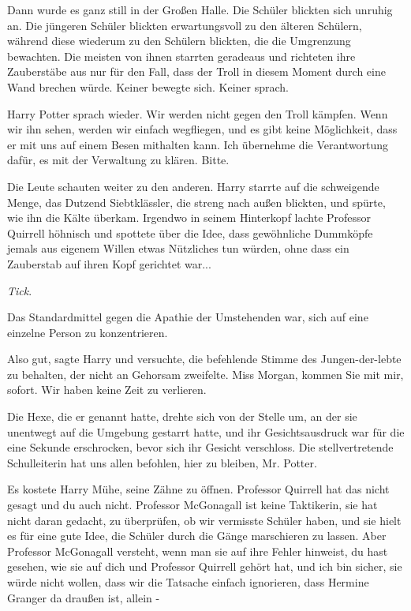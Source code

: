 Dann wurde es ganz still in der Großen Halle. Die Schüler blickten sich unruhig
an. Die jüngeren Schüler blickten erwartungsvoll zu den älteren Schülern,
während diese wiederum zu den Schülern blickten, die die Umgrenzung bewachten.
Die meisten von ihnen starrten geradeaus und richteten ihre Zauberstäbe aus nur
für den Fall, dass der Troll in diesem Moment durch eine Wand brechen würde.
Keiner bewegte sich. Keiner sprach.

Harry Potter sprach wieder. \glqq Wir werden nicht gegen den Troll kämpfen. Wenn
wir ihn sehen, werden wir einfach wegfliegen, und es gibt keine Möglichkeit,
dass er mit uns auf einem Besen mithalten kann. Ich übernehme die Verantwortung
dafür, es mit der Verwaltung zu klären. Bitte.\grqq{}

Die Leute schauten weiter zu den anderen. Harry starrte auf die schweigende
Menge, das Dutzend Siebtklässler, die streng nach außen blickten, und spürte,
wie ihn die Kälte überkam. Irgendwo in seinem Hinterkopf lachte Professor
Quirrell höhnisch und spottete über die Idee, dass gewöhnliche Dummköpfe jemals
aus eigenem Willen etwas Nützliches tun würden, ohne dass ein Zauberstab auf
ihren Kopf gerichtet war...

\emph{Tick}.

Das Standardmittel gegen die Apathie der Umstehenden war, sich auf eine einzelne
Person zu konzentrieren.

\glqq Also gut\grqq{}, sagte Harry und versuchte, die befehlende Stimme des
Jungen-der-lebte zu behalten, der nicht an Gehorsam zweifelte. \glqq Miss
Morgan, kommen Sie mit mir, sofort. Wir haben keine Zeit zu verlieren.\grqq{}

Die Hexe, die er genannt hatte, drehte sich von der Stelle um, an der sie
unentwegt auf die Umgebung gestarrt hatte, und ihr Gesichtsausdruck war für die
eine Sekunde erschrocken, bevor sich ihr Gesicht verschloss. \glqq Die
stellvertretende Schulleiterin hat uns allen befohlen, hier zu bleiben, Mr.
Potter.\grqq{}

Es kostete Harry Mühe, seine Zähne zu öffnen. \glqq Professor Quirrell hat das
nicht gesagt und du auch nicht. Professor McGonagall ist keine Taktikerin, sie
hat nicht daran gedacht, zu überprüfen, ob wir vermisste Schüler haben, und sie
hielt es für eine gute Idee, die Schüler durch die Gänge marschieren zu lassen.
Aber Professor McGonagall versteht, wenn man sie auf ihre Fehler hinweist, du
hast gesehen, wie sie auf dich und Professor Quirrell gehört hat, und ich bin
sicher, sie würde nicht wollen, dass wir die Tatsache einfach ignorieren, dass
Hermine Granger da draußen ist, allein -\grqq{}

